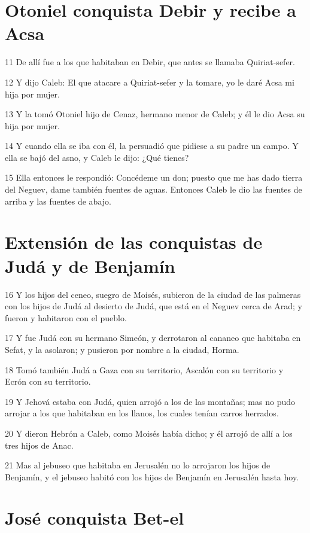 \section*{Otoniel conquista Debir y recibe a Acsa }

\par 11 De allí fue a los que habitaban en Debir, que antes se llamaba Quiriat-sefer. 
\par 12 Y dijo Caleb: El que atacare a Quiriat-sefer y la tomare, yo le daré Acsa mi hija por mujer.
\par 13 Y la tomó Otoniel hijo de Cenaz, hermano menor de Caleb; y él le dio Acsa su hija por mujer.
\par 14 Y cuando ella se iba con él, la persuadió que pidiese a su padre un campo. Y ella se bajó del asno, y Caleb le dijo: ¿Qué tienes?
\par 15 Ella entonces le respondió: Concédeme un don; puesto que me has dado tierra del Neguev, dame también fuentes de aguas. Entonces Caleb le dio las fuentes de arriba y las fuentes de abajo.

\section*{Extensión de las conquistas de Judá y de Benjamín}

\par 16 Y los hijos del ceneo, suegro de Moisés, subieron de la ciudad de las palmeras con los hijos de Judá al desierto de Judá, que está en el Neguev cerca de Arad; y fueron y habitaron con el pueblo.
\par 17 Y fue Judá con su hermano Simeón, y derrotaron al cananeo que habitaba en Sefat, y la asolaron; y pusieron por nombre a la ciudad, Horma.
\par 18 Tomó también Judá a Gaza con su territorio, Ascalón con su territorio y Ecrón con su territorio.
\par 19 Y Jehová estaba con Judá, quien arrojó a los de las montañas; mas no pudo arrojar a los que habitaban en los llanos, los cuales tenían carros herrados.
\par 20 Y dieron Hebrón a Caleb, como Moisés había dicho; y él arrojó de allí a los tres hijos de Anac. 
\par 21 Mas al jebuseo que habitaba en Jerusalén no lo arrojaron los hijos de Benjamín, y el jebuseo habitó con los hijos de Benjamín en Jerusalén hasta hoy. 

\section*{José conquista Bet-el}

